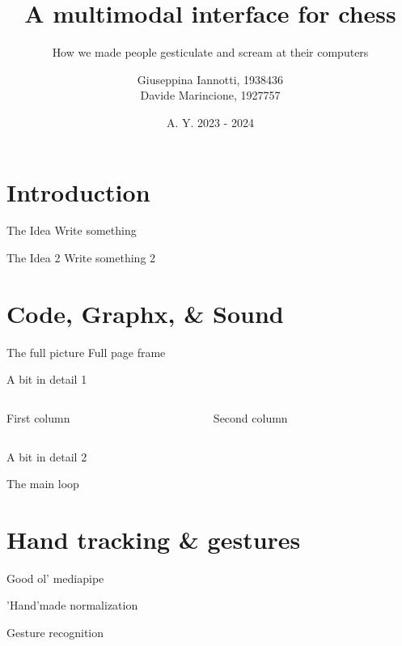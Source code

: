 \documentclass[english]{beamer}
\author{Giuseppina Iannotti, 1938436\\Davide Marincione, 1927757}
\title{A multimodal interface for chess}
\subtitle{How we made people gesticulate and scream at their computers}
\institute{Sapienza, University of Rome}
\date{A. Y. 2023 - 2024}
\begin{document}
\begin{frame}[t, plain]
\titlepage
\end{frame}

\section{Introduction}
\begin{frame}{The Idea}
    Write something
\end{frame}

\begin{frame}{The Idea 2}
    Write something 2
\end{frame}

\section{Code, Graphx, \& Sound}
\begin{frame}{The full picture}
    Full page frame
\end{frame}

\begin{frame}{A bit in detail 1}
    \begin{columns}
        \begin{column}{.5\textwidth}
            First column
        \end{column}
        \begin{column}{.5\textwidth}
            Second column
        \end{column}
    \end{columns}
\end{frame}

\begin{frame}{A bit in detail 2}
\end{frame}

\begin{frame}{The main loop}
\end{frame}

\section{Hand tracking \& gestures}
\begin{frame}{Good ol' mediapipe}
\end{frame}

\begin{frame}{'Hand'made normalization}
\end{frame}

\begin{frame}{Gesture recognition}
\end{frame}
\end{document}
